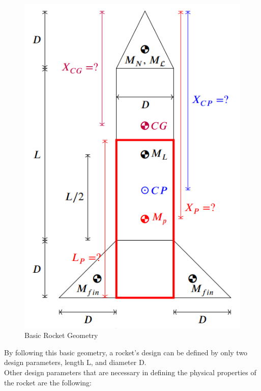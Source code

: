 \documentclass{report}
\begin{document}
\begin{figure}[h!]
    \centering
    \includegraphics[height = .31\textheight]{./figures/rocketShape.png}
    \caption{Basic Rocket Geometry}
    \label{fig:rocketgeo}
\end{figure}

\noindent By following this basic geometry, a rocket's design can be defined by only two design parameters, length L, and diameter D.\\

\noindent Other design parameters that are necessary in defining the physical properties of the rocket are the following:\\
\end{document}
